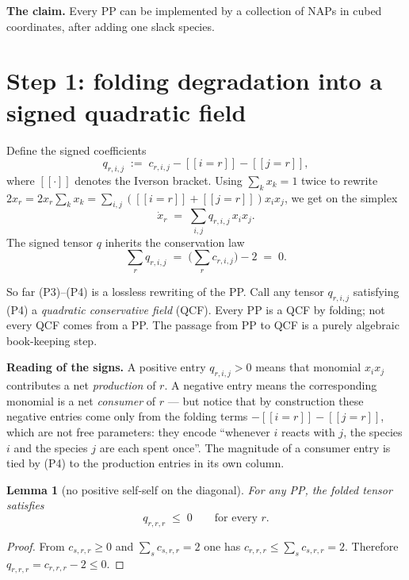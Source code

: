 \documentclass[11pt]{article}
\newtheorem{lemma}[theorem]{Lemma}
\newcommand{\iv}[1]{[\![#1]\!]}
\begin{document}
\medskip

\textbf{The claim.} Every PP can be implemented by a collection of NAPs
in cubed coordinates, after adding one slack species.

\section{Step 1: folding degradation into a signed quadratic field}

Define the signed coefficients
\begin{equation}
   q_{r,i,j} \;:=\; c_{r,i,j} - \iv{i=r} - \iv{j=r},
\end{equation}
where $\iv{\cdot}$ denotes the Iverson bracket. Using $\sum_k x_k = 1$
twice to rewrite $2x_r = 2 x_r \sum_k x_k = \sum_{i,j} (\iv{i=r}+\iv{j=r}) x_i x_j$,
we get on the simplex
\begin{equation}
   \dot x_r \;=\; \sum_{i,j} q_{r,i,j}\, x_i x_j.
   \tag{P3}
\end{equation}
The signed tensor $q$ inherits the conservation law
\begin{equation}
   \sum_r q_{r,i,j} \;=\; \Big(\sum_r c_{r,i,j}\Big) - 2 \;=\; 0.
   \tag{P4}
\end{equation}

So far (P3)--(P4) is a lossless rewriting of the PP. Call any tensor
$q_{r,i,j}$ satisfying (P4) a \emph{quadratic conservative field} (QCF).
Every PP is a QCF by folding; not every QCF comes from a PP. The passage
from PP to QCF is a purely algebraic book-keeping step.

\medskip

\textbf{Reading of the signs.} A positive entry $q_{r,i,j} > 0$ means
that monomial $x_i x_j$ contributes a net \emph{production} of $r$.
A negative entry means the corresponding monomial is a net
\emph{consumer} of $r$ --- but notice that by construction these
negative entries come only from the folding terms
$-\iv{i=r} - \iv{j=r}$, which are not free parameters: they encode
``whenever $i$ reacts with $j$, the species $i$ and the species $j$
are each spent once''. The magnitude of a consumer entry is tied by
(P4) to the production entries in its own column.

\begin{lemma}[no positive self-self on the diagonal]
\label{lem:nss}
For any PP, the folded tensor satisfies
\[
   q_{r,r,r} \;\le\; 0 \qquad \text{for every } r.
\]
\end{lemma}
\begin{proof}
From $c_{s,r,r} \ge 0$ and $\sum_s c_{s,r,r} = 2$ one has
$c_{r,r,r} \le \sum_s c_{s,r,r} = 2$. Therefore
$q_{r,r,r} = c_{r,r,r} - 2 \le 0$.
\end{proof}
\end{document}
